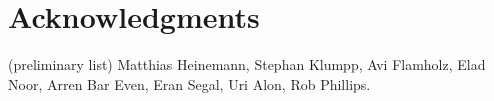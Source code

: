 \section{Acknowledgments}
(preliminary list) Matthias Heinemann, Stephan Klumpp, Avi Flamholz, Elad Noor, Arren Bar Even, Eran Segal, Uri Alon, Rob Phillips.